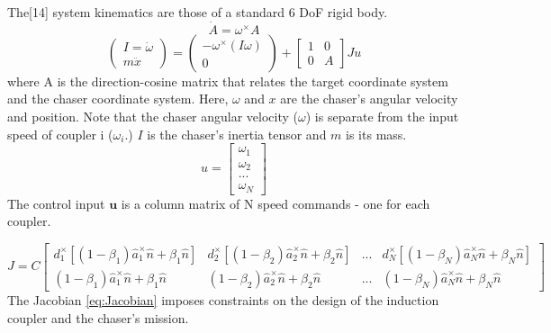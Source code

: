 
The[14] system kinematics are those of a standard 6 DoF rigid body. 
\begin{equation}\label{eq:rotMrxPropigation}
\dot{A} = \omega^{\times}A
\end{equation}
\begin{equation}\label{eq:RigidBodyKinematics}
\begin{pmatrix} 
I =\dot{\omega} \\
m\ddot{x}
 \end{pmatrix}
=
\begin{pmatrix} 
-\omega^{ \times} \left( I\omega \right) \\
0
\end{pmatrix}
+
\begin{bmatrix}
1 & 0 \\
0 & A
\end{bmatrix}
Ju
\end{equation}
where A is the direction-cosine matrix that relates the target coordinate system and the chaser coordinate system. Here, $\omega$ and $x$ are the chaser's angular velocity and position. Note that the chaser angular velocity ($\omega$) is separate from the input speed of coupler i ($\omega_i$.)  $I$ is the chaser's inertia tensor and $m$ is its mass.
\begin{equation}
\label{eq:u_definition}
u = 
\begin{bmatrix}
\omega_1\\
\omega_2\\
...\\
\omega_N
\end{bmatrix}
\end{equation}
The control input $\boldsymbol{u}$ is a column matrix of N speed commands - one for each coupler.

\begin{equation}\label{eq:Jacobian}
J = C\begin{bmatrix} 
d_1^{\times}\left[ \left(1-\beta_1 \right )\hat{a}_1^{\times}\hat{n} + \beta_1\hat{n}\right ]&
d_2^{\times}\left[\left(1-\beta_2 \right )\hat{a}_2^{\times}\hat{n} + \beta_2\hat{n}\right ] &
 ... &
d_N^{\times} \left[\left(1-\beta_N \right )\hat{a}_N^{\times}\hat{n} + \beta_N\hat{n}\right ]
\\

\left(1-\beta_1 \right )\hat{a}_1^{\times}\hat{n} + \beta_1\hat{n}&
\left(1-\beta_2 \right )\hat{a}_2^{\times}\hat{n} + \beta_2\hat{n} &
 ... &
 \left(1-\beta_N \right )\hat{a}_N^{\times}\hat{n} + \beta_N\hat{n}
\end{bmatrix}
\end{equation}
The Jacobian \ref{eq:Jacobian}  imposes constraints on the design of the induction coupler and the chaser's mission.

